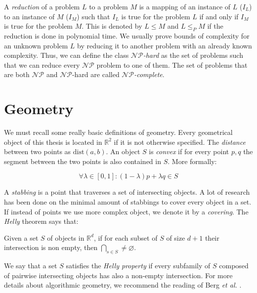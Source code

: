 A \emph{reduction} of a problem $L$ to a problem $M$ is a mapping of an instance of $L$ ($I_L$) to an instance of $M$ ($I_M$) such that $I_L$ is true for the problem $L$ if and
only if $I_M$ is true for the problem $M$. This is denoted by $L \leq M$ and $L \leq_P M$ if the reduction is done in polynomial time. We usually prove bounds of complexity for an unknown problem $L$ by reducing it to another problem with an already known complexity. Thus, we can define the class \emph{$\mathcal{NP}$-hard} as the set of problems such that we can reduce every $\mathcal{NP}$ problem to one of them. The set of problems that are both $\mathcal{NP}$ and $\mathcal{NP}$-hard are called \emph{$\mathcal{NP}$-complete}.

\section{Geometry}

We must recall some really basic definitions of geometry. Every geometrical object of this thesis is located in $\mathbb{R}^2$ if it is not otherwise specified. The \emph{distance} between two points as $\text{dist}(a,b)$. An object $S$ is \emph{convex} if for every point $p,q$ the segment between the two points is also contained in $S$. More formally:

$$\forall \lambda \in [0,1]: (1-\lambda)p + \lambda q \in S$$

A \emph{stabbing} is a point that traverses a set of intersecting objects. A lot of research has been done \cite{schlipf2013stabbing} on the minimal amount of stabbings to cover every object in a set. If instead of points we use more complex object, we denote it by a \emph{covering}. The \emph{Helly} theorem says that:

\begin{_theo}
  Given a set $S$ of objects in $\mathbb{R}^d$, if for each subset of $S$ of
  size $d+1$ their intersection is non empty, then $\bigcap_{s \in S} \neq
  \varnothing$.
\end{_theo}

We say that a set $S$ satisfies the \emph{Helly property} if every subfamily of $S$ composed of pairwise intersecting objects has also a non-empty intersection. For more details about algorithmic geometry, we recommend the reading of Berg \textit{et al.} \cite{bergComputationalGeometryAlgorithms2008}.

